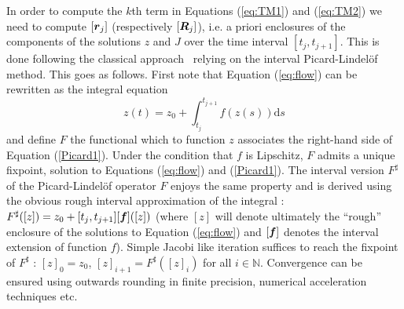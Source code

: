 \documentclass{sig-alternate-05-2015}
\newcommand\ForAuthors[1]%
 {\par\smallskip                     %
  \begin{center}%
   \fbox%
   {\parbox{0.9\linewidth}%
    {\raggedright\sc--- #1}%
   }%
  \end{center}%
  \par\smallskip                     %
 }
\def\N{{\mathbb N}}
\def\intvl#1{\mbox{$[ #1 ]$}}
\begin{document}
In order to compute the $k$th term in Equations (\ref{eq:TM1}) and (\ref{eq:TM2}) we need
to compute $\intvl{\r_j}$ (respectively $\intvl{\bfm{R}_j}$), i.e. a priori enclosures of
the components of the solutions $z$ and $J$ over the
time interval $[t_j,t_{j+1}]$. This is done following the classical approach~\cite{Nedialkov99} relying on the  interval
Picard-Lindel\"of method. This goes as follows. First note that Equation 
(\ref{eq:flow}) can be rewritten as the integral equation
\begin{equation}
z(t) = z_0+\int_{t_j}^{t_{j+1}} \! f(z(s)) \mathrm{d}s
\label{Picard1}
\end{equation}
and define $F$ the functional which to function $z$ associates the right-hand
side of Equation (\ref{Picard1}). Under the condition that $f$ is Lipschitz, $F$ 
admits a unique fixpoint, solution to Equations (\ref{eq:flow}) and
(\ref{Picard1}). The interval version ${F}^{\sharp}$ of the Picard-Lindel\"of operator $F$ 
enjoys the same property and is derived using the obvious rough interval approximation
of the integral : $F^{\sharp}(\intvl{z})=z_0+[t_j,t_{j+1}][\f](\intvl{z})$ (where
$\intvl{z}$ will denote ultimately the ``rough'' enclosure of the solutions to
Equation (\ref{eq:flow}) and $[\f]$ denotes  the interval extension of function $f$). 
Simple Jacobi like iteration suffices to reach the fixpoint of $F^{\sharp}$ : 
$\intvl{z}_0=z_0$, $\intvl{z}_{i+1}=F^{\sharp}(\intvl{z}_i)$ for all $i \in \N$. 
Convergence can be ensured using outwards rounding in finite precision,
numerical acceleration techniques etc. 

\end{document}
